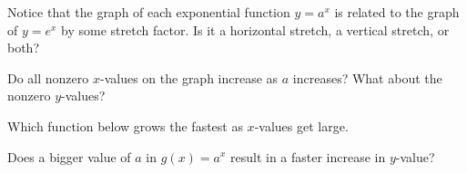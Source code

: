 \begin{question}
Notice that the graph of each exponential function $y=a^x$ is related to the graph of $y=e^x$ by some stretch factor. Is it a horizontal stretch, a vertical stretch, or both? 
  \begin{solution}
    \begin{multiple-choice}
    \end{multiple-choice}
    \begin{hint}
      Do all nonzero $x$-values on the graph increase as $a$ increases? What about the nonzero $y$-values?
    \end{hint}
  \end{solution}
\end{question}

\begin{question}
Which function below grows the fastest as $x$-values get large.
  \begin{solution}
    \begin{multiple-choice}
    \end{multiple-choice}
    \begin{hint}
      Does a bigger value of $a$ in $g(x)=a^x$ result in a faster increase in $y$-value?
    \end{hint}
  \end{solution}
\end{question}

